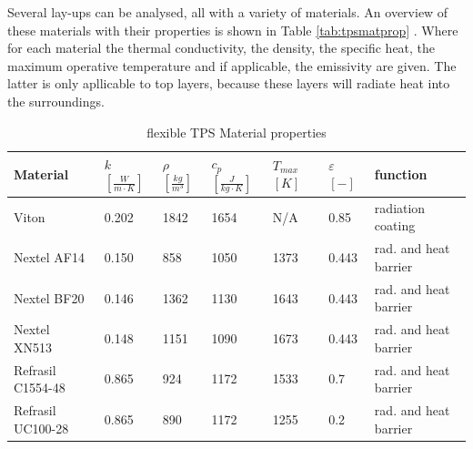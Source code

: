 Several lay-ups can be analysed, all with a variety of materials. An overview of these materials with their properties is shown in Table  \ref{tab:tpsmatprop} \cite{Corso2009, DuPont2011 , Smith2011} . Where for each material the thermal conductivity, the density, the specific heat, the maximum operative temperature and if applicable, the emissivity are given. The latter is only apllicable to top layers, because these layers will radiate heat into the surroundings.

\begin{table}[H]
	\caption {flexible TPS Material properties}
	\centering
	\begin{tabular}{|l|l|l|l|l|l|l|}
		\hline
		\textbf{Material}         & \textbf{ $ k $ $ \left[ \frac{W}{m \cdot K} \right] $} & \textbf{ $ \rho $ $ \left[ \frac{kg}{m^3} \right] $} & \textbf{  $ c_{p} $ $ \left[ \frac{J}{kg \cdot K} \right] $ }& \textbf{ $ T_{max} $ $ [ K ] $} &\textbf{ $ \varepsilon $ $ [ - ] $} & \textbf{function} \\[1.6ex]   \hline \hline
		Viton       & 0.202 & 1842 & 1654 & N/A	 & 0.85 & radiation coating
		\\ \hline
		Nextel AF14       & 0.150                                                 & 858                                        & 1050                                            & 1373	 & 0.443    & rad. and heat barrier                                 \\ \hline
		Nextel BF20       & 0.146 
		& 1362                                        & 1130 
		& 1643	 & 0.443  & rad. and heat barrier                                  
		\\ \hline
		Nextel XN513      & 0.148                                                 & 1151                                       & 1090                                            & 1673	 & 0.443           & rad. and heat barrier                               \\ \hline
		Refrasil C1554-48 & 0.865                                                 & 924                                        & 1172                                            & 1533	 & 0.7     & rad. and heat barrier                                       \\ \hline
		Refrasil UC100-28 & 0.865                                                 & 890                                        & 1172                                            & 1255  & 0.2       & rad. and heat barrier                                    \\ \hline

\end{tabular}
\end{table}
